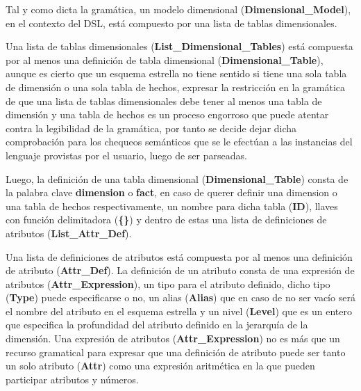 Tal y como dicta la gramática, un modelo dimensional (\textbf{Dimensional\_Model}), 
en el contexto del DSL, est\'a compuesto por una lista de tablas 
dimensionales. 

Una lista de tablas dimensionales (\textbf{List\_Dimensional\_Tables}) est\'a compuesta por al menos 
una definición de tabla dimensional 
(\textbf{Dimensional\_Table}), aunque es cierto que un esquema estrella no tiene sentido si tiene una sola tabla 
de dimensión o una sola tabla de hechos, expresar la restricción en la gramática de que una lista de 
tablas dimensionales debe tener al menos una tabla de dimensión y una tabla de hechos es un proceso 
engorroso que puede atentar contra la legibilidad de la gramática, por tanto se decide dejar dicha 
comprobación para los chequeos semánticos que se le efectúan a las instancias del lenguaje provistas 
por el usuario, luego de ser parseadas. 

Luego, la 
definición de una tabla dimensional (\textbf{Dimensional\_Table}) consta de la palabra clave \textbf{dimension} o \textbf{fact}, 
en caso de querer definir una dimension o una tabla de hechos respectivamente, un nombre para dicha tabla 
(\textbf{ID}), llaves con función delimitadora (\textbf{\{\}}) y dentro de estas una lista de definiciones de atributos
(\textbf{List\_Attr\_Def}). 

Una lista de definiciones de atributos est\'a compuesta por al menos una definición de atributo (\textbf{Attr\_Def}). 
La definición de un atributo consta de una expresión de atributos (\textbf{Attr\_Expression}), un tipo para el atributo 
definido, dicho tipo (\textbf{Type}) puede especificarse o no, un alias (\textbf{Alias}) que en caso de no ser vacío ser\'a el nombre del 
atributo en el esquema estrella y un nivel (\textbf{Level}) que es un entero que especifica la profundidad 
del atributo definido en la jerarquía de la dimensión. Una expresión de atributos (\textbf{Attr\_Expression}) no es m\'as que 
un recurso gramatical para expresar que una definición de atributo puede ser tanto un solo atributo (\textbf{Attr})
como una expresión aritmética en la que pueden participar atributos y n\'umeros. 

